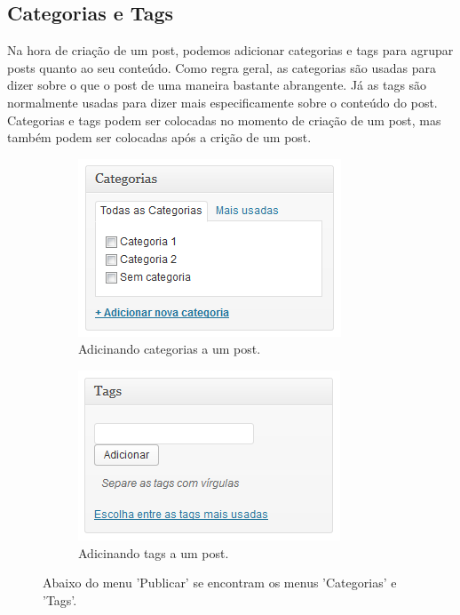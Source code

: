 \documentclass[12pt,onecolumn]{article}
\begin{document}
	\subsection{Categorias e Tags}
		Na hora de criação de um post, podemos adicionar categorias e tags 
		para agrupar posts quanto ao seu conteúdo. Como regra geral, as
		categorias são usadas para dizer sobre o que o post de uma maneira
		bastante abrangente. Já as tags são normalmente usadas para dizer
		mais especificamente sobre o conteúdo do post. Categorias e tags
		podem ser colocadas no momento de criação de um post, mas
		também podem ser colocadas após a crição de um post.
		\begin{figure}[H]
			\begin{subfigure}{.55\textwidth}
				\centering
				\includegraphics{categorias1.png}
				\caption{Adicinando categorias a um post.}
			\end{subfigure}
			\begin{subfigure}{.4\textwidth}
				\centering
				\includegraphics{tags1.png}
				\caption{Adicinando tags a um post.}
			\end{subfigure}
			\caption{Abaixo do menu 'Publicar' se encontram os menus 'Categorias' e 'Tags'.}
		\end{figure}
\end{document}
